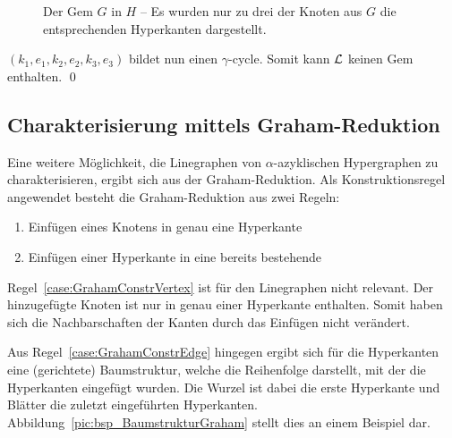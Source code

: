 \begin{Proof}
\begin{figure}[htbp]
        \caption[Der Gem $G$ in $H$]{Der Gem $G$ in $H$ -- Es wurden nur zu drei der Knoten aus $G$ die entsprechenden Hyperkanten dargestellt.}
        \label{pic:GemGinH}
    \end{figure}

    $(k_1,e_1,k_2,e_2,k_3,e_3)$ bildet nun einen $\gamma$-cycle. Somit kann $\mathcal{L}$ keinen Gem enthalten.
    \qed    
    
\end{Proof}

\subsection{Charakterisierung mittels Graham-Reduktion}
Eine weitere Möglichkeit, die Linegraphen von $\alpha$-azyklischen Hypergraphen zu charakterisieren, ergibt sich aus der Graham-Reduktion. Als Konstruktionsregel angewendet besteht die Graham-Reduktion aus zwei Regeln:
\begin{enumerate}
	\item \label{case:GrahamConstrVertex} Einfügen eines Knotens in genau eine Hyperkante
	\item \label{case:GrahamConstrEdge} Einfügen einer Hyperkante in eine bereits bestehende
\end{enumerate}

Regel~\ref{case:GrahamConstrVertex} ist für den Linegraphen nicht relevant. Der hinzugefügte Knoten ist nur in genau einer Hyperkante enthalten. Somit haben sich die Nachbarschaften der Kanten durch das Einfügen nicht verändert.

Aus Regel~\ref{case:GrahamConstrEdge} hingegen ergibt sich für die Hyperkanten eine (gerichtete) Baumstruktur, welche die Reihenfolge darstellt, mit der die Hyperkanten eingefügt wurden. Die Wurzel ist dabei die erste Hyperkante und Blätter die zuletzt eingeführten Hyperkanten. Abbildung~\ref{pic:bsp_BaumstrukturGraham} stellt dies an einem Beispiel dar.

